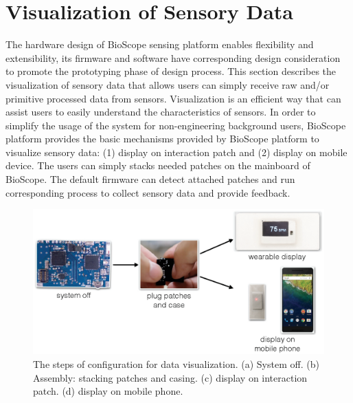 



\section{Visualization of Sensory Data}
The hardware design of BioScope sensing platform enables flexibility and extensibility, its firmware and software have corresponding design consideration to promote the prototyping phase of design process. This section describes the visualization of sensory data that allows users can simply receive raw and/or primitive processed data from sensors. Visualization is an efficient way that can assist users to easily understand the characteristics of sensors. 
In order to simplify the usage of the system for non-engineering background users, BioScope platform provides the basic mechanisms provided by BioScope platform to visualize sensory data: (1) display on interaction patch and (2) display on mobile device. The users can simply stacks needed patches on the mainboard of BioScope. The default firmware can detect attached patches and run corresponding process to collect sensory data and provide feedback.

\begin{figure}
\centering
\includegraphics[width=14cm]{image/fig_config.ps}
\caption{The steps of configuration for data visualization. (a) System off. (b) Assembly: stacking patches and casing. (c) display on interaction patch. (d) display on mobile phone.}
\label{fig_config}
\end{figure}

